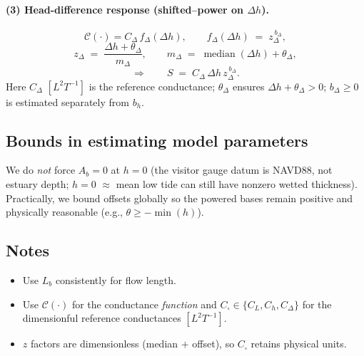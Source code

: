 \documentclass[preprint,12pt,authoryear]{elsarticle}
\begin{document}
\paragraph{(3) Head-difference response (shifted--power on $\Delta h$).}
\[
\mathcal{C}(\cdot)= C_\Delta\,f_\Delta(\Delta h),
\qquad
f_\Delta(\Delta h) \;=\; z_{\Delta}^{\,b_{\Delta}},
\]
\[
z_{\Delta}\;=\;\frac{\Delta h+\theta_{\Delta}}{\,m_{\Delta}\,},\qquad 
m_{\Delta}\;=\;\operatorname{median}(\Delta h)+\theta_{\Delta},
\]
\[
\Rightarrow\qquad
S \;=\; C_\Delta\,\Delta h\, z_{\Delta}^{\,b_{\Delta}}.
\]
Here $C_\Delta$ $[L^2T^{-1}]$ is the reference conductance; $\theta_\Delta$ ensures $\Delta h+\theta_\Delta>0$; $b_\Delta\ge 0$ is estimated separately from $b_h$.

\subsection*{Bounds in estimating model parameters}

We do \emph{not} force $A_b=0$ at $h=0$ (the visitor gauge datum is NAVD88, not estuary depth; $h=0$ $\approx$ mean low tide can still have nonzero wetted thickness). Practically, we bound offsets globally so the powered bases remain positive and physically reasonable (e.g., $\theta \ge -\min(h)$).

\subsection*{Notes}

\begin{itemize}
\item Use $L_b$ consistently for flow length.
\item Use $\mathcal{C}(\cdot)$ for the conductance \emph{function} and $C_{\square}\in\{C_L,C_h,C_\Delta\}$ for the dimensionful reference conductances $[L^2T^{-1}]$.
\item $z$ factors are dimensionless (median $+$ offset), so $C_{\square}$ retains physical units.
\end{itemize}
\end{document}
